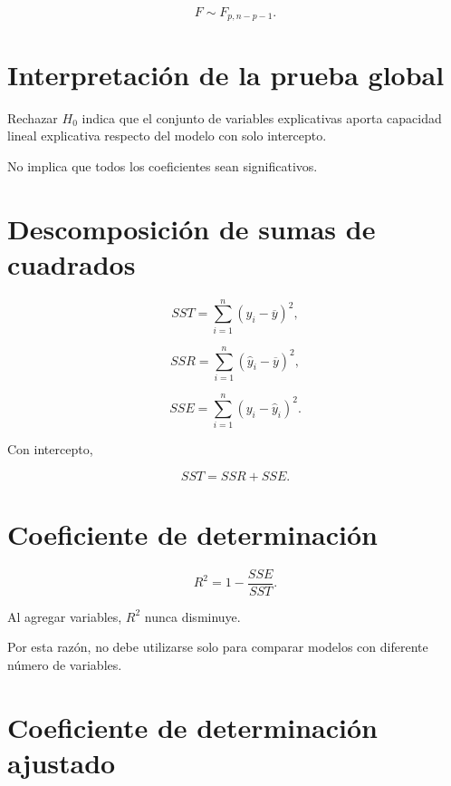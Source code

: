 \documentclass[
  spanish,
  10.5pt,
  letterpaper,
  DIV=11,
  numbers=noendperiod,
  oneside,
  open=any]{scrreprt}
\theoremstyle{definition}
\theoremstyle{definition}
\theoremstyle{plain}
\theoremstyle{remark}
\begin{document}
\[
F
\sim
F_{p,n-p-1}.
\]

\section*{Interpretación de la prueba
global}\label{interpretaciuxf3n-de-la-prueba-global}


Rechazar \(H_0\) indica que el conjunto de variables explicativas aporta
capacidad lineal explicativa respecto del modelo con solo intercepto.

No implica que todos los coeficientes sean significativos.

\section*{Descomposición de sumas de
cuadrados}\label{descomposiciuxf3n-de-sumas-de-cuadrados}


\[
SST
=
\sum_{i=1}^{n}
(y_i-\overline{y})^2,
\]

\[
SSR
=
\sum_{i=1}^{n}
(\widehat{y}_i-\overline{y})^2,
\]

\[
SSE
=
\sum_{i=1}^{n}
(y_i-\widehat{y}_i)^2.
\]

Con intercepto,

\[
SST
=
SSR
+
SSE.
\]

\section*{Coeficiente de
determinación}\label{coeficiente-de-determinaciuxf3n-1}


\[
R^2
=
1-
\frac{
SSE
}{
SST
}.
\]

Al agregar variables, \(R^2\) nunca disminuye.

Por esta razón, no debe utilizarse solo para comparar modelos con
diferente número de variables.

\section*{Coeficiente de determinación
ajustado}\label{coeficiente-de-determinaciuxf3n-ajustado}
\end{document}
